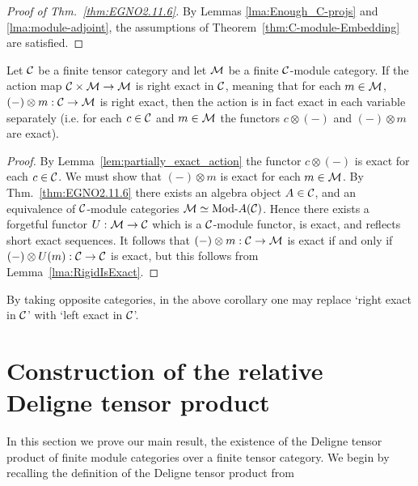 \documentclass{amsart}
\begin{document}
\begin{proof}[Proof of Thm.~\ref{thm:EGNO2.11.6}]
By Lemmas \ref{lma:Enough_C-projs} and \ref{lma:module-adjoint}, the assumptions of Theorem~\ref{thm:C-module-Embedding} are satisfied.
\end{proof}

\begin{corollary} \label{cor:biexact_action}
	Let $\mathcal C$ be a finite tensor category and let $\mathcal M$ be a finite $\mathcal C$-module category. If the action map $\mathcal C \times \mathcal M \to \mathcal M$ is right exact in $\mathcal C$, meaning that for each $m \in \mathcal M$, $(-) \otimes m: \mathcal C \to \mathcal M$ is right exact, then the action is in fact exact in each variable separately (i.e. for each $c \in \mathcal C$ and $m \in \mathcal M$ the functors $c \otimes (-)$ and $(-) \otimes m$ are exact).  
\end{corollary}

\begin{proof}
	By Lemma~\ref{lem:partially_exact_action} the functor $c \otimes (-)$ is exact for each $c \in \mathcal C$. We must show that $(-) \otimes m$ is exact for each $m \in \mathcal M$. By Thm.~\ref{thm:EGNO2.11.6} there exists an algebra object $A \in \mathcal C$, and an equivalence of $\mathcal C$-module categories $\cM \simeq \Mod{}{A}(\cC)$. Hence there exists a forgetful functor $U:\mathcal M \to \mathcal C$ which is a $\mathcal C$-module functor, is exact, and reflects short exact sequences. It follows that $(-) \otimes m: \mathcal C \to \mathcal M$ is exact if and only if $(-) \otimes U(m): \mathcal C \to \mathcal C$ is exact, but this follows from Lemma~\ref{lma:RigidIsExact}. 
\end{proof}

\begin{remark}
	By taking opposite categories, in the above corollary one may replace `right exact in $\mathcal C$' with `left exact in $\mathcal C$'. 
\end{remark}


\section{Construction of the relative Deligne tensor product} \label{sec:tc-deligne}

In this section we prove our main result, the existence of the Deligne tensor product of finite module categories over a finite tensor category.  We begin by recalling the definition of the Deligne tensor product from \cite{0909.3140}
\end{document}
